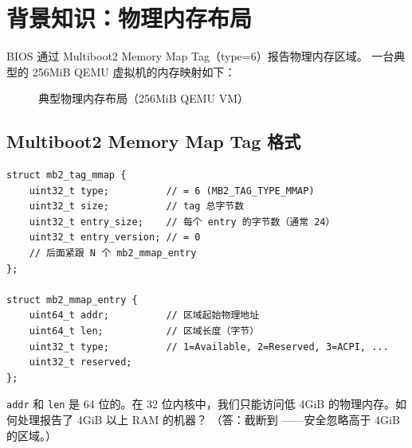 \section{背景知识：物理内存布局}

BIOS 通过 Multiboot2 Memory Map Tag（type=6）报告物理内存区域。
一台典型的 256MiB QEMU 虚拟机的内存映射如下：

\begin{figure}[H]
  \centering
  
  \caption{典型物理内存布局（256MiB QEMU VM）}
\end{figure}

\subsection{Multiboot2 Memory Map Tag 格式}

\begin{lstlisting}[style=cstyle]
struct mb2_tag_mmap {
    uint32_t type;          // = 6 (MB2_TAG_TYPE_MMAP)
    uint32_t size;          // tag 总字节数
    uint32_t entry_size;    // 每个 entry 的字节数（通常 24）
    uint32_t entry_version; // = 0
    // 后面紧跟 N 个 mb2_mmap_entry
};

struct mb2_mmap_entry {
    uint64_t addr;          // 区域起始物理地址
    uint64_t len;           // 区域长度（字节）
    uint32_t type;          // 1=Available, 2=Reserved, 3=ACPI, ...
    uint32_t reserved;
};
\end{lstlisting}

\begin{thinkbox}
\texttt{addr} 和 \texttt{len} 是 64 位的。在 32 位内核中，我们只能访问低 4GiB
的物理内存。如何处理报告了 4GiB 以上 RAM 的机器？
（答：截断到 ——安全忽略高于 4GiB 的区域。）
\end{thinkbox}


